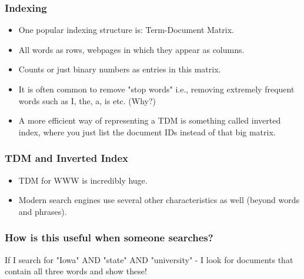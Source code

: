 \documentclass{beamer}
\begin{document}
\begin{frame}
\frametitle{Indexing}
\begin{itemize}
\item One popular indexing structure is: Term-Document Matrix.
\item All words as rows, webpages in which they appear as columns.
\item Counts or just binary numbers as entries in this matrix. \pause
\item It is often common to remove "stop words" i.e., removing extremely frequent words such as I, the, a, is etc. (Why?) \pause
\item A more efficient way of representing a TDM is something called inverted index, where you just list the document IDs instead of that big matrix. 
\end{itemize}
\end{frame}

\begin{frame}
\frametitle{TDM and Inverted Index}
\begin{figure}%
    \centering
    \qquad \pause
    \label{fig:example}%
\end{figure}
\pause
\begin{itemize}
\item TDM for WWW is incredibly huge. 
\item Modern search engines use several other characteristics as well (beyond words and phrases).
\end{itemize}
\end{frame}

\begin{frame}
\frametitle{How is this useful when someone searches?}
If I search for "Iowa" AND "state" AND "university" - I look for documents that contain all three words and show these!
\end{frame}
\end{document}
